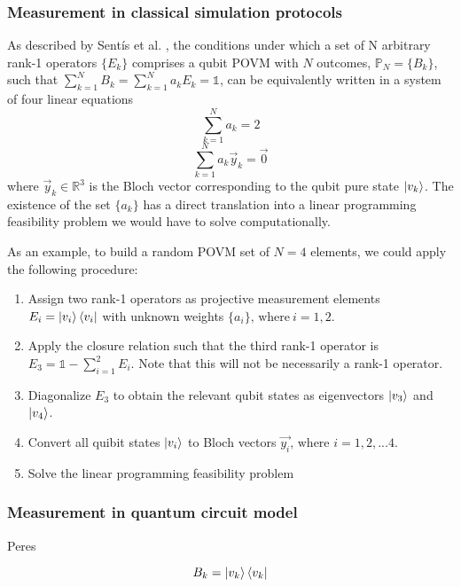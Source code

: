 \subsubsection{Measurement in classical simulation protocols}
As described by Sent\'is et al. \cite{sentis2013}, the conditions under which a set of N arbitrary rank-1 operators $\{E_{k}\}$ comprises a qubit POVM with $N$ outcomes, $\mathbb{P}_N=\{B_{k}\}$, such that $\sum_{k=1}^{N} B_{k} = \sum_{k=1}^{N} a_{k} E_{k} = \mathbb{1}$, can be equivalently written in a system of four linear equations
\begin{equation}
    \sum_{k=1}^{N} a_{k} = 2
\end{equation}
\begin{equation}
    \sum_{k=1}^{N} a_{k} \vec{y}_{k} = \vec{0}
\end{equation}
where $\vec{y}_{k} \in \mathbb{R}^3$ is the Bloch vector corresponding to the qubit pure state $\ket{v_{k}}$. The existence of the set $\{a_{k}\}$ has a direct translation into a linear programming feasibility problem we would have to solve computationally.

As an example, to build a random POVM set of $N=4$ elements, we could apply the following procedure:
\begin{enumerate}
\item Assign two rank-1 operators as projective measurement elements $E_i = \ket{v_i}\bra{v_i}$ with unknown weights $\{a_i\} \text{, where}\ i=1,2$.
\item Apply the closure relation such that the third rank-1 operator is $E_3 = \mathbb{1} - \sum_{i=1}^{2}E_i$. Note that this will not be necessarily a rank-1 operator.
\item Diagonalize $E_3$ to obtain the relevant qubit states as eigenvectors $\ket{v_3}$ and $\ket{v_4}$.
\item Convert all quibit states $\ket{v_i}$ to Bloch vectors $\vec{y_i} \text{, where } i=1,2,...4$.
\item Solve the linear programming feasibility problem
\end{enumerate}


\subsubsection{Measurement in quantum circuit model}
Peres \cite{peres1995}

\begin{equation}
B_{k} = \ket{v_{k}} \bra{v_{k}}
\end{equation}

